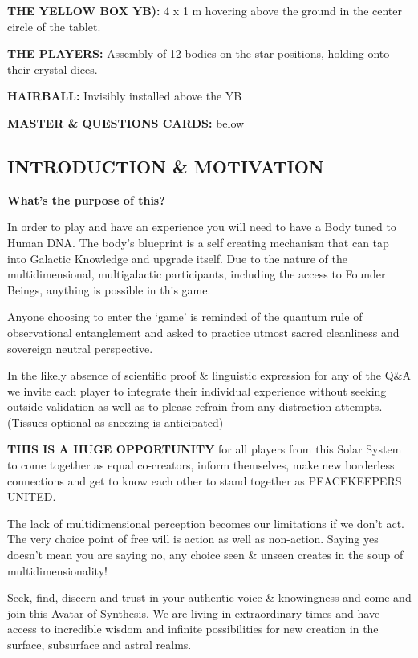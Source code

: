 \textbf{THE YELLOW BOX YB):} 4 x 1 m hovering above the ground in the
center circle of the tablet.

\textbf{THE PLAYERS:} Assembly of 12 bodies on the star positions,
holding onto their crystal dices.

\textbf{HAIRBALL:} Invisibly installed above the YB

\textbf{MASTER \& QUESTIONS CARDS:} below

\subsection{INTRODUCTION \& MOTIVATION}\label{introduction-motivation}

\textbf{What's the purpose of this?}

In order to play and have an experience you will need to have a Body
tuned to Human DNA. The body's blueprint is a self creating mechanism
that can tap into Galactic Knowledge and upgrade itself. Due to the
nature of the multidimensional, multigalactic participants, including
the access to Founder Beings, anything is possible in this game.

Anyone choosing to enter the `game' is reminded of the quantum rule of
observational entanglement and asked to practice utmost sacred
cleanliness and sovereign neutral perspective.

In the likely absence of scientific proof \& linguistic expression for
any of the Q\&A we invite each player to integrate their individual
experience without seeking outside validation as well as to please
refrain from any distraction attempts. (Tissues optional as sneezing is
anticipated)

\textbf{THIS IS A HUGE OPPORTUNITY} for all players from this Solar
System to come together as equal co-creators, inform themselves, make
new borderless connections and get to know each other to stand together
as PEACEKEEPERS UNITED.

The lack of multidimensional perception becomes our limitations if we
don't act. The very choice point of free will is action as well as
non-action. Saying yes doesn't mean you are saying no, any choice seen
\& unseen creates in the soup of multidimensionality!

Seek, find, discern and trust in your authentic voice \& knowingness and
come and join this Avatar of Synthesis. We are living in extraordinary
times and have access to incredible wisdom and infinite possibilities
for new creation in the surface, subsurface and astral realms.

